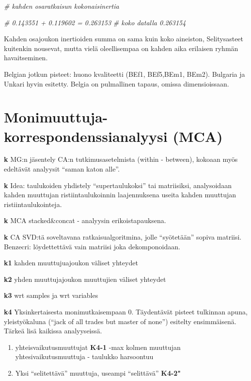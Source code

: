 \documentclass[
  finnish,
]{book}
\newenvironment{Shaded}{\begin{snugshade}}{\end{snugshade}}
\newcommand{\CommentTok}[1]{\textcolor[rgb]{0.56,0.35,0.01}{\textit{#1}}}
\begin{document}
\begin{Shaded}
\begin{Highlighting}[]
\CommentTok{# kahden osaratkaisun kokonaisinertia}

\CommentTok{# 0.143551 + 0.119602 = 0.263153}
\CommentTok{# koko datalla 0.263154}
\end{Highlighting}
\end{Shaded}

Kahden osajoukon inertioiden summa on sama kuin koko aineiston, Selitysasteet
kuitenkin nousevat, mutta vielä oleellisempaa on kahden aika erilaisen ryhmän
havaitseminen.

Belgian jotkun pisteet: huono kvaliteetti (BEf1, BEf5,BEm1, BEm2). Bulgaria ja
Unkari hyvin esitetty. Belgia on pulmallinen tapaus, omissa dimensioissaan.

\hypertarget{monimuuttuja-korrespondenssianalyysi-mca}{%
\chapter{Monimuuttuja-korrespondenssianalyysi (MCA)}\label{monimuuttuja-korrespondenssianalyysi-mca}}

\textbf{k} MG:n jäsentely CA:n tutkimusasetelmista (within - between), kokoaan myös
edeltävät analyysit ``saman katon alle''.

\textbf{k} Idea: taulukoiden yhdistely ``supertaulukoksi'' tai matriisiksi, analysoidaan kahden muuttujan
ristiintaulukoinnin laajennuksena useita kahden muuttujan ristiintaulukointeja.

\textbf{k} MCA stacked\&concat - analyysin erikoistapauksena.

\textbf{k} CA SVD:tä soveltavana ratkaisualgoritmina, jolle ``syötetään'' sopiva matriisi. Benzecri: löydettettävä vain
matriisi joka dekomponoidaan.

\textbf{k1} kahden muuttujuajoukon väliset yhteydet

\textbf{k2} yhden muuttujajoukon muuttujien väliset yhteydet

\textbf{k3} wrt samples ja wrt variables

\textbf{k4} Yksinkertaisesta monimutkaisempaan
0. Täydentävät pisteet tulkinnan apuna, yleistyökaluna (``jack of all trades but
master of none'') esitelty ensimmäisenä. Tärkeä lisä kaikissa analyyseissä.

\begin{enumerate}
\def\labelenumi{\arabic{enumi}.}
\item
  yhteisvaikutusmuuttujat \textbf{K4-1}
  -max kolmen muuttujan yhtesivaikutusmuuttuja - taulukko harsoontuu
\item
  Yksi ``selitettävä'' muuttuja, useampi ``selittävä'' \textbf{K4-2"}
\end{enumerate}
\end{document}
